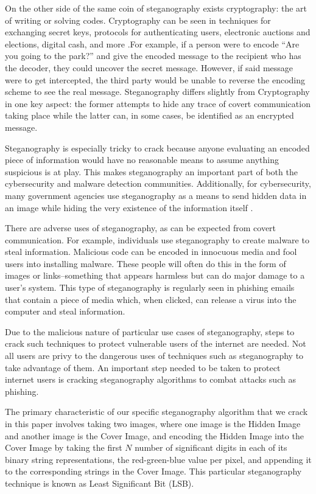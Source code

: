 \documentclass[conference]{IEEEtran}
\begin{document}
On the other side of the same coin of steganography exists cryptography: the art of writing or solving codes. Cryptography can be seen in techniques for exchanging secret keys, protocols for authenticating users, electronic auctions and elections, digital cash, and more \cite{katz_introduction_2015}.For example, if a person were to encode “Are you going to the park?” and give the encoded message to the recipient who has the decoder, they could uncover the secret message. However, if said message were to get intercepted, the third party would be unable to reverse the encoding scheme to see the real message. Steganography differs slightly from Cryptography in one key aspect: the former attempts to hide any trace of covert communication taking place while the latter can, in some cases, be identified as an encrypted message.

Steganography is especially tricky to crack because anyone evaluating an encoded piece of information would have no reasonable means to assume anything suspicious is at play. This makes steganography an important part of both the cybersecurity and malware detection communities. Additionally, for cybersecurity, many government agencies use steganography as a means to send hidden data in an image while hiding the very existence of the information itself \cite{seethalakshmi_security_2016}.

There are adverse uses of steganography, as can be expected from covert communication. For example, individuals use steganography to create malware to steal information. Malicious code can be encoded in innocuous media and fool users into installing malware. These people will often do this in the form of images or links--something that appears harmless but can do major damage to a user's system. This type of steganography is regularly seen in phishing emails that contain a piece of media which, when clicked, can release a virus into the computer and steal information. 

Due to the malicious nature of particular use cases of steganography, steps to crack such techniques to protect vulnerable users of the internet are needed. Not all users are privy to the dangerous uses of techniques such as steganography to take advantage of them. An important step needed to be taken to protect internet users is cracking steganography algorithms to combat attacks such as phishing. 

The primary characteristic of our specific steganography algorithm that we crack in this paper involves taking two images, where one image is the Hidden Image and another image is the Cover Image, and encoding the Hidden Image into the Cover Image by taking the first $N$ number of significant digits in each of its binary string representations, the red-green-blue value per pixel, and appending it to the corresponding strings in the Cover Image. This particular steganography technique is known as Least Significant Bit (LSB).
\end{document}
